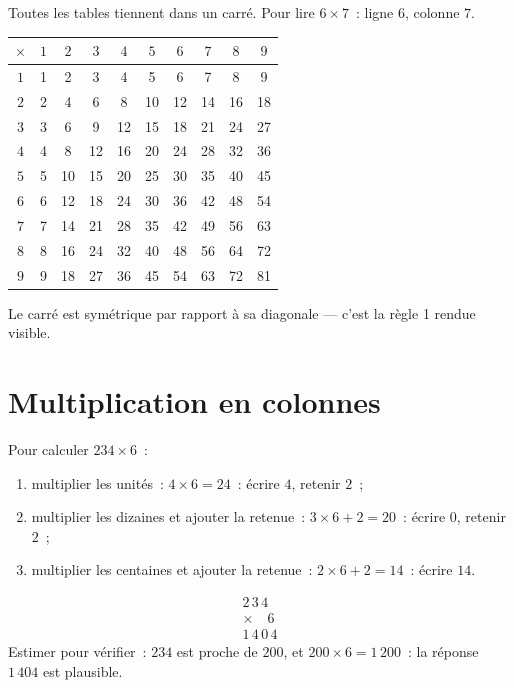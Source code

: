 \begin{example}\label{ex:g3:mult:table}
Toutes les tables tiennent dans un carré. Pour lire $6 \times 7$~:
ligne $6$, colonne $7$.
\begin{center}
\renewcommand{\arraystretch}{1.15}
\begin{tabular}{c|ccccccccc}
$\times$ & $1$ & $2$ & $3$ & $4$ & $5$ & $6$ & $7$ & $8$ & $9$ \\
\hline
$1$ & 1 & 2 & 3 & 4 & 5 & 6 & 7 & 8 & 9 \\
$2$ & 2 & 4 & 6 & 8 & 10 & 12 & 14 & 16 & 18 \\
$3$ & 3 & 6 & 9 & 12 & 15 & 18 & 21 & 24 & 27 \\
$4$ & 4 & 8 & 12 & 16 & 20 & 24 & 28 & 32 & 36 \\
$5$ & 5 & 10 & 15 & 20 & 25 & 30 & 35 & 40 & 45 \\
$6$ & 6 & 12 & 18 & 24 & 30 & 36 & 42 & 48 & 54 \\
$7$ & 7 & 14 & 21 & 28 & 35 & 42 & 49 & 56 & 63 \\
$8$ & 8 & 16 & 24 & 32 & 40 & 48 & 56 & 64 & 72 \\
$9$ & 9 & 18 & 27 & 36 & 45 & 54 & 63 & 72 & 81 \\
\end{tabular}
\end{center}
Le carré est symétrique par rapport à sa diagonale --- c'est la
règle 1 rendue visible.
\end{example}

\section{Multiplication en colonnes}

\begin{method}\label{met:g3:mult:column}
Pour calculer $234 \times 6$~:
\begin{enumerate}
  \item multiplier les unités~: $4 \times 6 = 24$~: écrire $4$,
        retenir $2$~;
  \item multiplier les dizaines et ajouter la retenue~:
        $3 \times 6 + 2 = 20$~: écrire $0$, retenir $2$~;
  \item multiplier les centaines et ajouter la retenue~:
        $2 \times 6 + 2 = 14$~: écrire $14$.
\end{enumerate}
\[
\begin{array}{r}
2\,3\,4 \\
\times \quad 6 \\
\hline
1\,4\,0\,4
\end{array}
\]
Estimer pour vérifier~: $234$ est proche de $200$, et
$200 \times 6 = 1\,200$~: la réponse $1\,404$ est plausible.
\end{method}

